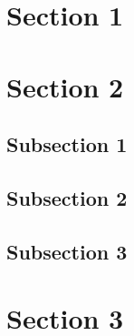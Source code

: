 \section{Section 1}%
\blindtext%
%
%
\section{Section 2}%
\blindtext%
%
%
\subsection{Subsection 1}%
\blindtext%
%
%
\subsection{Subsection 2}%
\blindtext%
%
%
\subsection{Subsection 3}%
\blindtext%
%
%
\section{Section 3}%
\blindtext%
%
%
